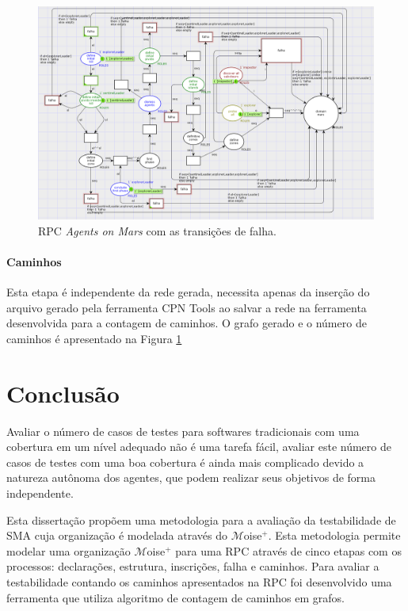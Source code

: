 \begin{figure}
\centering
\includegraphics[scale=0.55]{imagens/5-rpc-final2.png}
\caption{RPC \textit{Agents on Mars} com as transições de falha.}
\label{fig:5-rpc-final2}
\end{figure}

\subsubsection{Caminhos}
Esta etapa é independente da rede gerada, necessita apenas da inserção do arquivo gerado pela ferramenta CPN Tools ao salvar a rede na ferramenta desenvolvida para a contagem de caminhos. O grafo gerado e o número de caminhos é apresentado na Figura \ref{}




\chapter{Conclusão}
Avaliar o número de casos de testes para softwares tradicionais com uma cobertura em um nível adequado não é uma tarefa fácil, avaliar este número de casos de testes com uma boa cobertura é ainda mais complicado devido a natureza autônoma dos agentes, que podem realizar seus objetivos de forma independente.

Esta dissertação propõem uma metodologia para a avaliação da testabilidade de SMA cuja organização é modelada através do $\mathcal{M}$oise$^{+}$. Esta metodologia permite modelar uma organização $\mathcal{M}$oise$^{+}$ para uma RPC através de cinco etapas com os processos: declarações, estrutura, inscrições, falha e caminhos. Para avaliar a testabilidade contando os caminhos apresentados na RPC foi desenvolvido uma ferramenta que utiliza algoritmo de contagem de caminhos em grafos.

